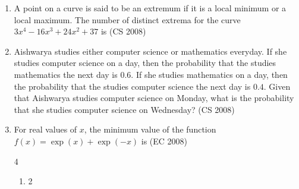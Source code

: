 \begin{enumerate}[label=\thesubsection.\arabic*,ref=\thesubsection.\theenumi]
\hfill(AG 2008)
\begin{enumerate}
\end{enumerate}
%
\item A point on a curve is said to be an extremum if it is a local minimum or a local maximum. The number of distinct extrema for the curve $3x^4-16x^3+24x^2+37$ is 
\hfill (CS 2008)
\begin{enumerate}
\end{enumerate}
\item Aishwarya studies either computer science or mathematics everyday. If she studies computer science on a day, then the probability that the studies mathematics the next day is $0.6$. If she studies mathematics on a day, then the probability that the studies computer science the next day is $0.4$. Given that Aishwarya studies computer science on Monday, what is the probability that she studies computer science on Wednesday?
\hfill (CS 2008)
\begin{enumerate} 
\end{enumerate}
\item For real values of $x$, the minimum value of the function $f(x) = \exp(x) + \exp(-x)$ is
\hfill (EC 2008)
\begin{multicols}{4}
    \begin{enumerate}
        \item 2

\end{enumerate}
\end{multicols}
\end{enumerate}
